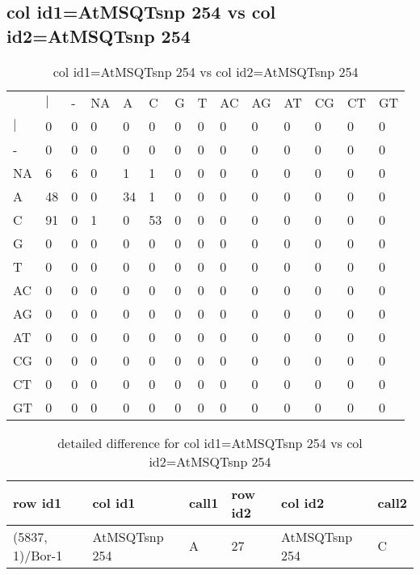 \subsection{col id1=AtMSQTsnp 254 vs col id2=AtMSQTsnp 254}
\begin{center}
\begin{longtable}{|l|l|l|l|l|l|l|l|l|l|l|l|l|l|}
\caption{col id1=AtMSQTsnp 254 vs col id2=AtMSQTsnp 254} \label{table_dm602}\\
\hline
\\
\hline
&$|$&-&NA&A&C&G&T&AC&AG&AT&CG&CT&GT\\
$|$&0&0&0&0&0&0&0&0&0&0&0&0&0\\
-&0&0&0&0&0&0&0&0&0&0&0&0&0\\
NA&6&6&0&1&1&0&0&0&0&0&0&0&0\\
A&48&0&0&34&1&0&0&0&0&0&0&0&0\\
C&91&0&1&0&53&0&0&0&0&0&0&0&0\\
G&0&0&0&0&0&0&0&0&0&0&0&0&0\\
T&0&0&0&0&0&0&0&0&0&0&0&0&0\\
AC&0&0&0&0&0&0&0&0&0&0&0&0&0\\
AG&0&0&0&0&0&0&0&0&0&0&0&0&0\\
AT&0&0&0&0&0&0&0&0&0&0&0&0&0\\
CG&0&0&0&0&0&0&0&0&0&0&0&0&0\\
CT&0&0&0&0&0&0&0&0&0&0&0&0&0\\
GT&0&0&0&0&0&0&0&0&0&0&0&0&0\\
\hline
\end{longtable}
\end{center}

\begin{center}
\begin{longtable}{|l|l|l|l|l|l|}
\caption{detailed difference for col id1=AtMSQTsnp 254 vs col id2=AtMSQTsnp 254} \label{table_dm603}\\
\hline
row id1&col id1&call1&row id2&col id2&call2\\
\hline
(5837, 1)/Bor-1&AtMSQTsnp 254&A&27&AtMSQTsnp 254&C\\
\hline
\end{longtable}
\end{center}

